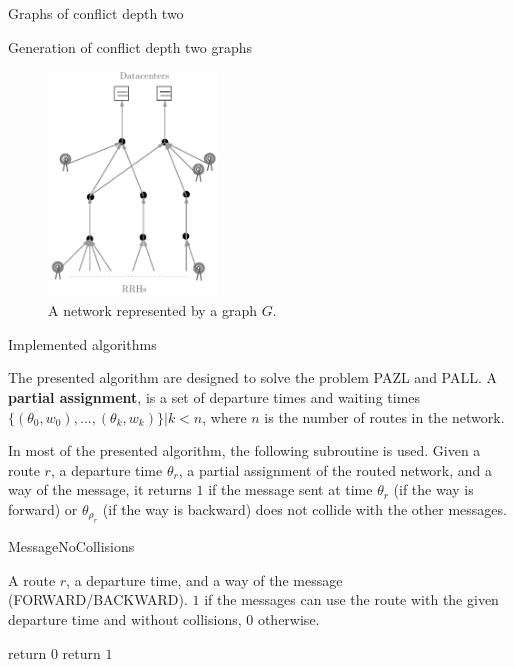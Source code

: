 \documentclass[10pt]{article}
\begin{document}
\begin{section}{Graphs of conflict depth two}
\begin{subsection}{Generation of conflict depth two graphs}
\begin{figure}[h]
\begin{center}
 \includegraphics[width=0.4\textwidth]{extendendgraphgrey}
\caption{A network represented by a graph $G$.}\label{fig:extendendgraphgrey}
\end{center}
\end{figure}
    \end{subsection}

  \begin{subsection}{Implemented algorithms}
  
 

  The presented algorithm are designed to solve the problem PAZL and PALL.
  A \textbf{partial assignment}, is a set of departure times and waiting times $\{(\theta_0,w_0),\ldots,(\theta_k,w_k)\}|k<n$, where $n$ is the number of routes in the network.
  
   
   
  In most of the presented algorithm, the following subroutine is used. Given a route $r$, a departure time $\theta_r$, a partial assignment of the routed network, and a way of the message, it returns $1$ if the message sent at time $\theta_r$ (if the way is forward) or $\theta_{\rho_r}$ (if the way is backward)  does not collide with the other messages. 
   	\begin{algorithm}[H]
 	\caption{MessageNoCollisions}
	\label{algo:messagenocollisions}
 	\begin{algorithmic}
 	\REQUIRE A route $r$, a departure time, and a way of the message (FORWARD/BACKWARD).
	\ENSURE $1$ if the messages can use the route with the given departure time and without collisions, $0$ otherwise.

 	\STATE return $0$
 	\ENDIF
 	\ENDFOR
	\STATE return $1$
 	\end{algorithmic}
 	\end{algorithm}
 	

\end{subsection}
\end{section}
\end{document}
